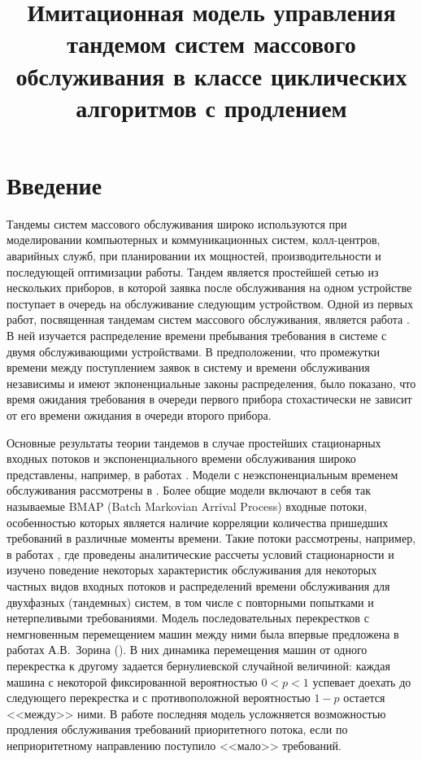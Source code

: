 \documentclass[11pt]{ubs}
\title{Имитационная модель управления тандемом систем массового обслуживания в классе циклических алгоритмов  с продлением }%
\begin{document}
\maketitle

\section{Введение}
Тандемы систем массового обслуживания широко используются при моделировании компьютерных и коммуникационных систем, колл-центров, аварийных служб, при планировании их мощностей, производительности и последующей оптимизации работы. 
Тандем является простейшей сетью из нескольких приборов, в которой заявка после обслуживания на одном устройстве  поступает в очередь на обслуживание следующим устройством.
Одной из первых работ, посвященная тандемам систем массового обслуживания, является работа \cite{Reich:1957}. В ней изучается распределение времени пребывания требования в системе с двумя обслуживающими устройствами. В предположении, что промежутки времени между поступлением заявок в систему и времени обслуживания независимы и имеют экпоненциальные законы распределения, было показано, что время ожидания требования в очереди первого прибора стохастически не зависит от его времени ожидания в очереди второго прибора. 

Основные результаты теории тандемов в случае простейших стационарных входных потоков и экспоненциального времени обслуживания широко представлены, например, в работах \cite{Balsamo:2003, Gnedenko:Konig:1983, Perros:1994, Perros:1989}. Модели с неэкспоненциальным временем обслуживания рассмотрены в \cite{Gomez:2002:1, Gomez:2002:2, Gomez:2002:3}. Более общие модели включают в себя так называемые BMAP (Batch Markovian Arrival Process) входные потоки, особенностью которых является наличие корреляции количества пришедших требований в различные моменты времени. Такие потоки рассмотрены, например, в работах \cite{Klimenok:Dudin:2005,Klimenok:Dudin:2004, Klimenok:2010, Klimenok:2011, Klimenok:2015}, где проведены аналитические рассчеты условий стационарности и изучено поведение некоторых характеристик обслуживания для некоторых частных видов входных потоков и распределений времени обслуживания для двухфазных (тандемных) систем, в том числе с повторными попытками и нетерпеливыми требованиями. 
Модель последовательных перекрестков с немгновенным перемещением машин между ними была впервые предложена в работах А.В.~Зорина (\cite{Zorine:2010, Zorine:2011:2, Zorine:2012}). В них динамика перемещения машин от одного перекрестка к другому задается бернулиевской случайной величиной: каждая машина с некоторой фиксированной вероятностью $0<p<1$ успевает доехать до следующего перекрестка и с противоположной вероятностью $1-p$ остается <<между>> ними. В работе \cite{Kocheganov:2017:1} последняя модель усложняется возможностью продления обслуживания требований приоритетного потока, если по неприоритетному направлению поступило <<мало>> требований. 
\end{document}

